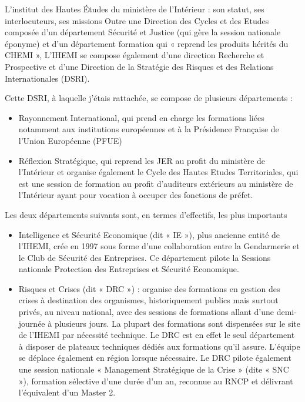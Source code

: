 \documentclass[10pt,a4paper]{report} %
\begin{document}
\begin{part}{L’institut des Hautes Études du ministère de l’Intérieur : son statut, ses interlocuteurs, ses missions}
Outre une Direction des Cycles et des Etudes composée d’un département Sécurité et Justice (qui gère la session nationale éponyme) et d’un département formation qui « reprend les produits hérités du CHEMI », L’IHEMI se compose également d’une direction Recherche et Prospective et d’une Direction de la Stratégie des Risques et des Relations Internationales (DSRI). 

Cette DSRI, à laquelle j’étais rattachée, se compose de plusieurs départements :
\begin{itemize}
    \item Rayonnement International, qui prend en charge les formations liées notamment aux institutions européennes et à la Présidence Française de l’Union Européenne (PFUE)
    \item Réflexion Stratégique, qui reprend les JER au profit du ministère de l’Intérieur et organise également le Cycle des Hautes Etudes Territoriales, qui est une session de formation au profit d’auditeurs extérieurs au ministère de l’Intérieur ayant pour vocation à occuper des fonctions de préfet.
\end{itemize}

Les deux départements suivants sont, en termes d’effectifs, les plus importants

\begin{itemize}
    \item Intelligence et Sécurité Economique (dit « IE »), plus ancienne entité de l’IHEMI, crée en 1997 sous forme d’une collaboration entre la Gendarmerie et le Club de Sécurité des Entreprises. Ce département pilote la Sessions nationale Protection des Entreprises et Sécurité Economique.
    \item Risques et Crises (dit « DRC ») : organise des formations en gestion des crises à destination des organismes, historiquement publics mais surtout privés, au niveau national, avec des sessions de formations allant d’une demi-journée à plusieurs jours. La plupart des formations sont dispensées sur le site de l’IHEMI par nécessité technique. Le DRC est en effet le seul département à disposer de plateaux techniques dédiés aux formations qu’il assure. L’équipe se déplace également en région lorsque nécessaire. Le DRC pilote également une session nationale « Management Stratégique de la Crise » (dite « SNC »), formation sélective d’une durée d’un an, reconnue au RNCP et délivrant l’équivalent d’un Master 2.
\end{itemize}


\end{part}
\end{document}
